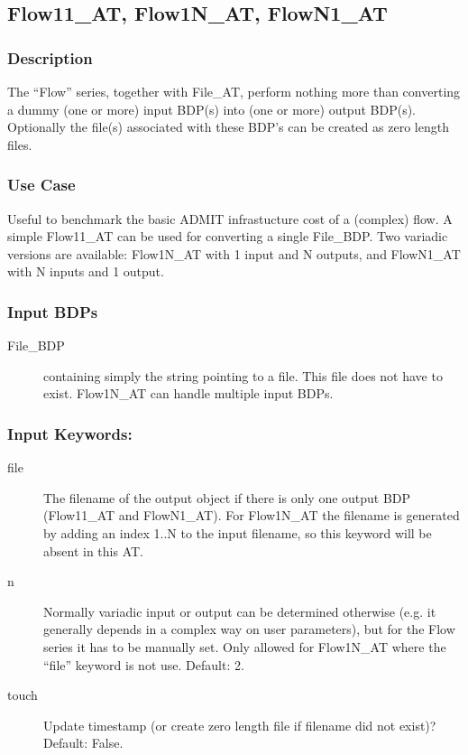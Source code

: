 
\subsection{Flow11\_AT, Flow1N\_AT, FlowN1\_AT}


\subsubsection{Description}


The ``Flow'' series, together with File\_AT, perform nothing more than
converting a dummy (one or more) input BDP(s) into (one or more) output BDP(s).
Optionally the file(s) associated with these BDP's can be created as zero
length files.


\subsubsection{Use Case}

Useful to benchmark the basic ADMIT infrastucture cost of a (complex)
flow.  A simple Flow11\_AT can be used for converting a single
File\_BDP. Two variadic versions are available:
Flow1N\_AT with 1 input and N outputs, and FlowN1\_AT with N inputs
and 1 output.


\subsubsection{Input BDPs}

\begin{description}

\item[File\_BDP] containing simply the string pointing to a file. This
  file does not have to exist. Flow1N\_AT can handle multiple input
  BDPs.

\end{description}

\subsubsection{Input Keywords:}

\begin{description}

\item[file] The filename of the output object if there is only one
  output BDP (Flow11\_AT and FlowN1\_AT). For Flow1N\_AT the filename
  is generated by adding an index 1..N to the input filename, so this
  keyword will be absent in this AT.

\item[n] Normally variadic input or output can be determined otherwise
  (e.g. it generally depends in a complex way on user parameters), but
  for the Flow series it has to be manually set.  Only allowed for
  Flow1N\_AT where the ``file'' keyword is not use.  Default: 2.

\item[touch]  Update timestamp (or create zero length file
  if filename did not exist)? Default: False.

\end{description}

